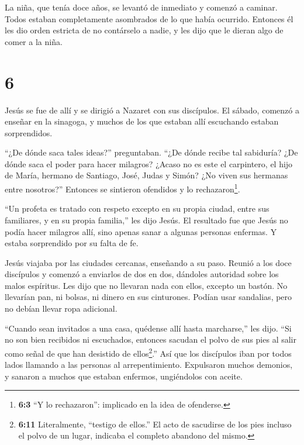  La niña, que tenía doce años, se levantó de inmediato y
comenzó a caminar. Todos estaban completamente asombrados de lo que
había ocurrido.  Entonces él les dio orden estricta de no
contárselo a nadie, y les dijo que le dieran algo de comer a la niña.

\hypertarget{section-5}{%
\section{6}\label{section-5}}

 Jesús se fue de allí y se dirigió a Nazaret con sus
discípulos.  El sábado, comenzó a enseñar en la sinagoga, y
muchos de los que estaban allí escuchando estaban sorprendidos.

``¿De dónde saca tales ideas?'' preguntaban. ``¿De dónde recibe tal
sabiduría? ¿De dónde saca el poder para hacer milagros? 
¿Acaso no es este el carpintero, el hijo de María, hermano de Santiago,
José, Judas y Simón? ¿No viven sus hermanas entre nosotros?'' Entonces
se sintieron ofendidos y lo rechazaron\footnote{\textbf{6:3} ``Y lo
  rechazaron'': implicado en la idea de ofenderse.}.

 ``Un profeta es tratado con respeto excepto en su propia
ciudad, entre sus familiares, y en su propia familia,'' les dijo Jesús.
 El resultado fue que Jesús no podía hacer milagros allí,
sino apenas sanar a algunas personas enfermas.  Y estaba
sorprendido por su falta de fe.

Jesús viajaba por las ciudades cercanas, enseñando a su paso.
 Reunió a los doce discípulos y comenzó a enviarlos de dos
en dos, dándoles autoridad sobre los malos espíritus.  Les
dijo que no llevaran nada con ellos, excepto un bastón. No llevarían
pan, ni bolsas, ni dinero en sus cinturones.  Podían usar
sandalias, pero no debían llevar ropa adicional.

 ``Cuando sean invitados a una casa, quédense allí hasta
marcharse,'' les dijo.  ``Si no son bien recibidos ni
escuchados, entonces sacudan el polvo de sus pies al salir como señal de
que han desistido de ellos\footnote{\textbf{6:11} Literalmente,
  ``testigo de ellos.'' El acto de sacudirse de los pies incluso el
  polvo de un lugar, indicaba el completo abandono del mismo.}.''
 Así que los discípulos iban por todos lados llamando a las
personas al arrepentimiento.  Expulsaron muchos demonios, y
sanaron a muchos que estaban enfermos, ungiéndolos con aceite.

